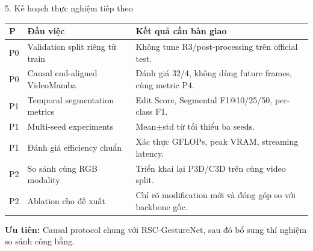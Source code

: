 \documentclass[aspectratio=169,9pt]{beamer}
\newcommand{\smallnote}[1]{{\fontsize{7.1}{8.4}\selectfont #1\par}}
\begin{document}
\begin{frame}{5. Kế hoạch thực nghiệm tiếp theo}
\vspace{0.04cm}
\renewcommand{\arraystretch}{1.52}
\begin{tabularx}{\linewidth}{@{}C{0.7cm}L{4.1cm}Y@{}}
\toprule
\textbf{P}&\textbf{Đầu việc}&\textbf{Kết quả cần bàn giao}\\\midrule
P0&Validation split riêng từ train&Không tune R3/post-processing trên official test.\\
P0&Causal end-aligned VideoMamba&Đánh giá 32/4, không dùng future frames, cùng metric P4.\\
P1&Temporal segmentation metrics&Edit Score, Segmental F1@10/25/50, per-class F1.\\
P1&Multi-seed experiments&Mean$\pm$std từ tối thiểu ba seeds.\\
P1&Đánh giá efficiency chuẩn&Xác thực GFLOPs, peak VRAM, streaming latency.\\
P2&So sánh cùng RGB modality&Triển khai lại P3D/C3D trên cùng video split.\\
P2&Ablation cho đề xuất&Chỉ rõ modification mới và đóng góp so với backbone gốc.\\\bottomrule
\end{tabularx}
\vspace{0.14cm}
\begin{tcolorbox}[keypanel]\centering
\smallnote{\textbf{Ưu tiên:} Causal protocol chung với RSC-GestureNet, sau đó bổ sung thí nghiệm so sánh công bằng.}
\end{tcolorbox}
\end{frame}
\end{document}
